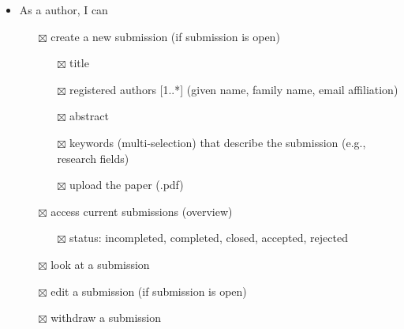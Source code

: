 \documentclass[nochapterpage,nopartpage,noheadingspace,numbersubsubsec,bigchapter,colorback,accentcolor=tud9c,10pt]{tudreport}
\begin{document}
\begin{itemize}
            \item As a author, I can
            \begin{itemize}
                \item[$\boxtimes$] create a new submission (if submission is open)
                \begin{itemize}
                    \item[$\boxtimes$] title
                    \item[$\boxtimes$] registered authors [1..*] (given name, family name, email affiliation)
                    \item[$\boxtimes$] abstract
                    \item[$\boxtimes$] keywords (multi-selection) that describe the submission (e.g., research fields)
                    \item[$\boxtimes$] upload the paper (.pdf)
                \end{itemize}
                \item[$\boxtimes$] access current submissions (overview)
                \begin{itemize}
                    \item[$\boxtimes$] status: incompleted, completed, closed, accepted, rejected
                \end{itemize}
                \item[$\boxtimes$] look at a submission
                \item[$\boxtimes$] edit a submission (if submission is open)
                \item[$\boxtimes$] withdraw a submission
            \end{itemize}


\end{itemize}
\end{document}
